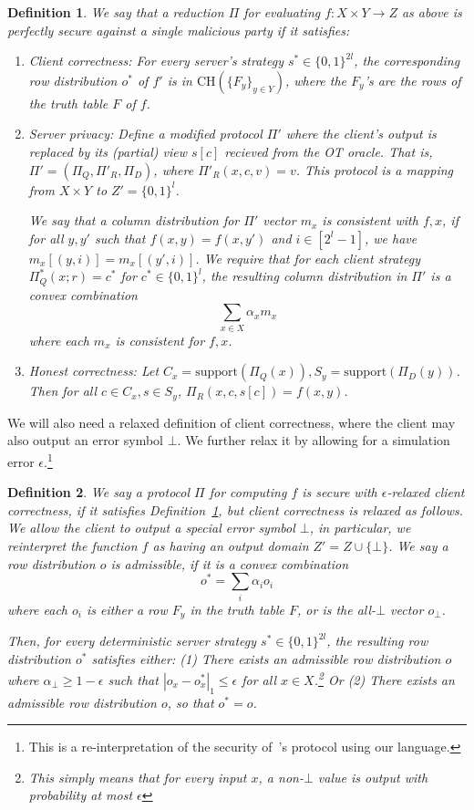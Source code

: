 \documentclass[a4paper]{article}
\newtheorem{definition}{Definition}[section]
\newcommand{\support}{\mathrm{support}}
\newcommand{\CH}[1]{\text{CH}(#1)}
\begin{document}
\begin{definition}\label{perfect-security}
We say that a reduction $\Pi$ for evaluating $f:X\times Y\rightarrow Z$ as above is perfectly secure against a single malicious party if it satisfies:
\begin{enumerate}
\item Client correctness: For every server's strategy $s^*\in \{0,1\}^{2l}$, the corresponding row distribution $o^*$ of $f'$
is in $\CH{\{F_y\}_{y\in Y}}$, where the $F_y$'s are the rows of the truth table $F$ of $f$.
\item Server privacy: Define a modified protocol $\Pi'$ where the client's output is replaced by its (partial) view $s[c]$ recieved from the OT oracle. That is, $\Pi'=(\Pi_Q,\Pi'_R,\Pi_D)$, where $\Pi'_R(x,c,v)=v$. This protocol is a mapping from $X\times Y$ to $Z'=\{0,1\}^l$.

We say that a column distribution for $\Pi'$ vector $m_x$ is consistent with $f,x$, if for all $y,y'$ such that $f(x,y)= f(x,y')$ and $i\in [2^l-1]$, we have $m_x[(y,i)]=m_x[(y',i)]$. 
We require that for each client strategy $\Pi^*_Q(x;r)=c^*$ for $c^*\in\{0,1\}^l$, the resulting column distribution in $\Pi'$ is a convex combination
\[\sum_{x\in X} \alpha_xm_x\] where each $m_x$ is consistent for $f,x$.

\item Honest correctness: Let $C_x=\support(\Pi_Q(x)),S_y=\support(\Pi_D(y))$. Then for all $c\in C_x,s\in S_y$, $\Pi_R(x,c,s[c])=f(x,y)$.
\end{enumerate}
\end{definition}

We will also need a relaxed definition of client correctness, where the client may also output an error symbol $\bot$. We further relax it by allowing for a simulation error $\epsilon$.\footnote{This is a re-interpretation of the security of~\cite{IKOPS}'s protocol using our language.}

\begin{definition}\label{weak-security}
We say a protocol $\Pi$ for computing $f$ is secure with $\epsilon$-relaxed client correctness, if it satisfies Definition~\ref{perfect-security}, but client correctness is relaxed as follows. We allow the client to output a special error symbol $\bot$, in particular, we reinterpret the function $f$ as having an output domain $Z'=Z\cup\{\bot\}$. 
We say a row distribution $o$ is admissible, if it is a convex combination 
\[o^* = \sum_i\alpha_io_i\]
where each $o_i$ is either a row $F_y$ in the truth table $F$, or is the all-$\bot$ vector $o_\bot$. 

Then, for every deterministic server strategy $s^*\in\{0,1\}^{2l}$, the resulting row distribution $o^*$ satisfies either:
(1) There exists an admissible row distribution $o$ where $\alpha_\bot\geq 1-\epsilon$ such that $|o_x-o^*_x|_1\leq \epsilon$ for all $x\in X$.\footnote{This simply means that for every input $x$, a non-$\bot$ value is output with probability at most $\epsilon$} Or  (2)
There exists an admissible row distribution $o$, so that $o^* = o$.
\end{definition}
\end{document}
